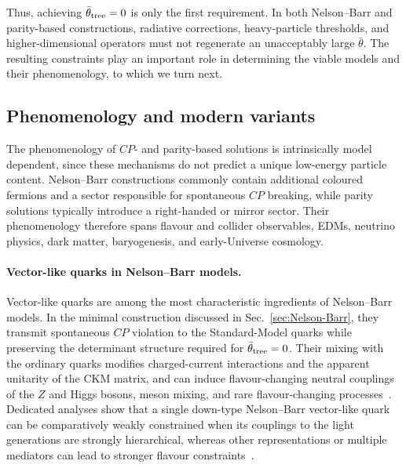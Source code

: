 \documentclass[review]{elsarticle}
\numberwithin{equation}{section}
\numberwithin{table}{section}
\numberwithin{figure}{section}
\begin{document}
Thus, achieving $\bar\theta_{\rm tree}=0$ is only the first requirement. In both Nelson--Barr and parity-based constructions, radiative corrections, heavy-particle thresholds, and higher-dimensional operators must not regenerate an unacceptably large $\bar\theta$. The resulting constraints play an important role in determining the viable models and their phenomenology, to which we turn next.


\subsection{Phenomenology and modern variants}
\label{sec:CP&P-Pheno}

The phenomenology of $CP$- and parity-based solutions is intrinsically model dependent, since these mechanisms do not predict a unique low-energy particle content. Nelson--Barr constructions commonly contain additional coloured fermions and a sector responsible for spontaneous $CP$ breaking, while parity solutions typically introduce a right-handed or mirror sector. Their phenomenology therefore spans flavour and collider observables, EDMs, neutrino physics, dark matter, baryogenesis, and early-Universe cosmology.

\paragraph{Vector-like quarks in Nelson--Barr models.}

Vector-like quarks are among the most characteristic ingredients of Nelson--Barr models. In the minimal construction discussed in Sec.~\ref{sec:Nelson-Barr}, they transmit spontaneous $CP$ violation to the Standard-Model quarks while preserving the determinant structure required for $\bar\theta_{\rm tree}=0$. Their mixing with the ordinary quarks modifies charged-current interactions and the apparent unitarity of the CKM matrix, and can induce flavour-changing neutral couplings of the $Z$ and Higgs bosons, meson mixing, and rare flavour-changing processes~\cite{Bento:1991ez,Dine:2015jga,Cherchiglia:2020kut,Cherchiglia:2021vhe,Valenti:2021rdu}. Dedicated analyses show that a single down-type Nelson--Barr vector-like quark can be comparatively weakly constrained when its couplings to the light generations are strongly hierarchical, whereas other representations or multiple mediators can lead to stronger flavour constraints~\cite{Cherchiglia:2020kut,Cherchiglia:2021vhe,Valenti:2021rdu}.
\end{document}

